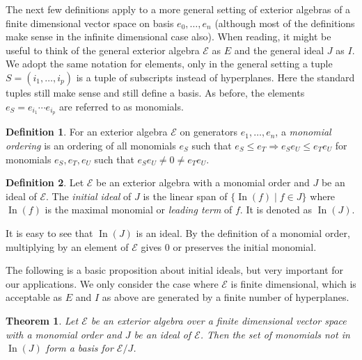 \documentclass[article,twoside]{article}
\newcommand{\script}[1]{\mathcal{#1}}
\newcommand{\initial}{\operatorname{In}}
\theoremstyle{plain}
\newtheorem{theorem}{Theorem}[section]
\theoremstyle{plain}
\theoremstyle{plain}
\theoremstyle{plain}
\theoremstyle{plain}
\theoremstyle{definition}
\newtheorem{definition}[definition]{Definition}
\theoremstyle{definition}
\theoremstyle{definition}
\theoremstyle{remark}
\theoremstyle{remark}
\begin{document}
The next few definitions apply to a more general setting of exterior algebras of a finite dimensional vector space on basis $e_0,\dots,e_n$ (although most of the definitions make sense in the infinite dimensional case also). When reading, it might be useful to think of the general exterior algebra $\script{E}$ as $E$ and the general ideal $J$ as $I$. We adopt the same notation for elements, only in the general setting a tuple $S=(i_1,\dots,i_p)$ is a tuple of subscripts instead of hyperplanes. Here the standard tuples still make sense and still define a basis. As before, the elements $e_S= e_{i_1}\cdots e_{i_p}$ are referred to as monomials.

\begin{definition}
	For an exterior algebra $\script{E}$ on generators $e_1,\dots,e_n$, a \emph{monomial ordering} is an ordering of all monomials $e_S$ such that $e_S\leq e_T \Rightarrow e_Se_U\leq e_Te_U$ for monomials $e_S,e_T,e_U$ such that $e_Se_U\neq 0 \neq e_Te_U$.
\end{definition}

\begin{definition}
	Let $\script{E}$ be an exterior algebra with a monomial order and $J$ be an ideal of $\script{E}$. The \emph{initial ideal} of $J$ is the linear span of $\{\initial(f) \mid f\in J\}$ where $\initial(f)$ is the maximal monomial or \emph{leading term} of $f$. It is denoted as $\initial(J)$.
\end{definition}

It is easy to see that $\initial(J)$ is an ideal. By the definition of a monomial order, multiplying by an element of $\script{E}$ gives $0$ or preserves the initial monomial.

The following is a basic proposition about initial ideals, but very important for our applications. We only consider the case where $\script{E}$ is finite dimensional, which is acceptable as $E$ and $I$ as above are generated by a finite number of hyperplanes.

\begin{theorem}\label{initial_basis}
	Let $\script{E}$ be an exterior algebra over a finite dimensional vector space with a monomial order and $J$ be an ideal of $\script{E}$. Then the set of monomials not in $\initial(J)$ form a basis for $\script{E}/J$.
\end{theorem}
\end{document}
